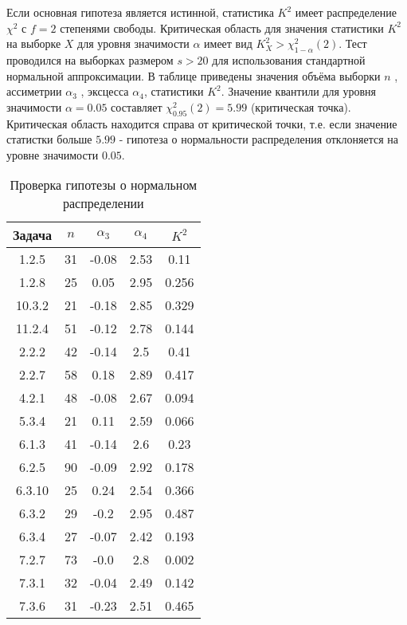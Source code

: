 Если основная гипотеза является истинной, статистика $K^2$ имеет распре\-деление $\chi^2$ с $f=2$ степенями свободы. Критическая область для значения статистики $K^2$ на выборке $X$ для уровня значимости $\alpha$ имеет вид $K^{2}_{X} > \chi^{2}_{1-\alpha}(2)$. Тест проводился на выборках размером $s>20$ для использования стандартной нормальной аппроксимации. В таблице приведены значения объ\-ёма выборки $n$ , ассиметрии $\alpha_3$ , эксцесса $\alpha_4$, статистики $K^2$. Значение кван\-тили для уровня значимости $\alpha = 0.05$ составляет $\chi^{2}_{0.95}(2) = 5.99$ (критическая точка). Критическая область находится справа от критической точки, т.е. если значение статистки больше $5.99$ - гипотеза о нормальности распределе\-ния отклоняется на уровне значимости $0.05$.


\begin{table}[H]
\caption{Проверка гипотезы о нормальном распределении}
\label{tabular:IRTtable}
\begin{center}
\begin{tabular}{|c|c|c|c|c|}
\hline
Задача & $n$   & $\alpha_3$ & $\alpha_4$ &$K^2$\\
\hline
1.2.5 & 31 & -0.08 & 2.53 & 0.11 \\ 
\hline
1.2.8 & 25 & 0.05 & 2.95 & 0.256 \\ 
\hline
10.3.2 & 21 & -0.18 & 2.85 & 0.329 \\ 
\hline
11.2.4 & 51 & -0.12 & 2.78 & 0.144 \\ 
\hline
2.2.2 & 42 & -0.14 & 2.5 & 0.41 \\ 
\hline
2.2.7 & 58 & 0.18 & 2.89 & 0.417 \\ 
\hline
4.2.1 & 48 & -0.08 & 2.67 & 0.094 \\ 
\hline
5.3.4 & 21 & 0.11 & 2.59 & 0.066 \\ 
\hline
6.1.3 & 41 & -0.14 & 2.6 & 0.23 \\ 
\hline
6.2.5 & 90 & -0.09 & 2.92 & 0.178 \\ 
\hline
6.3.10 & 25 & 0.24 & 2.54 & 0.366 \\ 
\hline
6.3.2 & 29 & -0.2 & 2.95 & 0.487 \\ 
\hline
6.3.4 & 27 & -0.07 & 2.42 & 0.193 \\ 
\hline
7.2.7 & 73 & -0.0 & 2.8 & 0.002 \\ 
\hline
7.3.1 & 32 & -0.04 & 2.49 & 0.142 \\ 
\hline
7.3.6 & 31 & -0.23 & 2.51 & 0.465 \\ 
\hline
\end{tabular}
\end{center}
\end{table}


